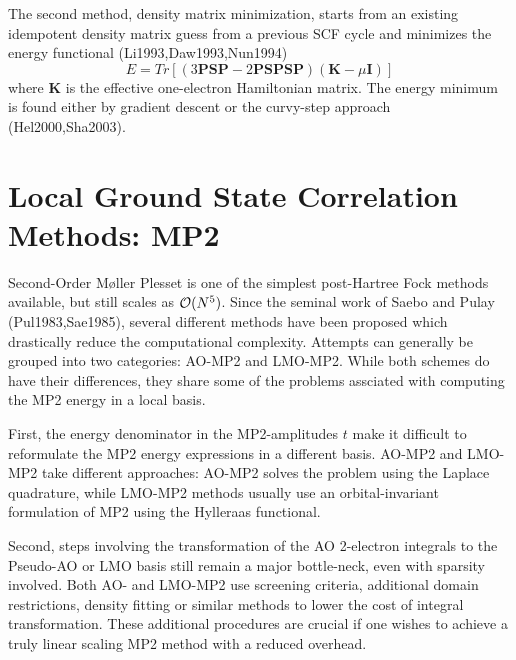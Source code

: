 The second method, density matrix minimization, starts from an existing idempotent density matrix guess from a previous SCF cycle and minimizes the energy functional (Li1993,Daw1993,Nun1994)
\begin{equation}
E = Tr\left[ \left(3\mathbf{PSP} - 2\mathbf{PSPSP}\right)\left(\mathbf{K} - \mu \mathbf{I}\right) \right]
\end{equation}
\noindent where $\mathbf{K}$ is the effective one-electron Hamiltonian matrix. The energy minimum is found either by gradient descent or the curvy-step approach (Hel2000,Sha2003).


\section{Local Ground State Correlation Methods: MP2}

Second-Order M{\o}ller Plesset is one of the simplest post-Hartree Fock methods available, but still scales as $\mathcal{O}(N^{5})$. Since the seminal work of Saebo and Pulay (Pul1983,Sae1985), several different methods have been proposed which drastically reduce the computational complexity. Attempts can generally be grouped into two categories: AO-MP2 and LMO-MP2. While both schemes do have their differences, they share some of the problems assciated with computing the MP2 energy in a local basis.

First, the energy denominator in the MP2-amplitudes $t$ make it difficult to reformulate the MP2 energy expressions in a different basis. AO-MP2 and LMO-MP2 take different approaches: AO-MP2 solves the problem using the Laplace quadrature, while LMO-MP2 methods usually use an orbital-invariant formulation of MP2 using the Hylleraas functional.

Second, steps involving the transformation of the AO 2-electron integrals to the Pseudo-AO or LMO basis still remain a major bottle-neck, even with sparsity involved. Both AO- and LMO-MP2 use screening criteria, additional domain restrictions, density fitting or similar methods to lower the cost of integral transformation. These additional procedures are crucial if one wishes to achieve a truly linear scaling MP2 method with a reduced overhead.

